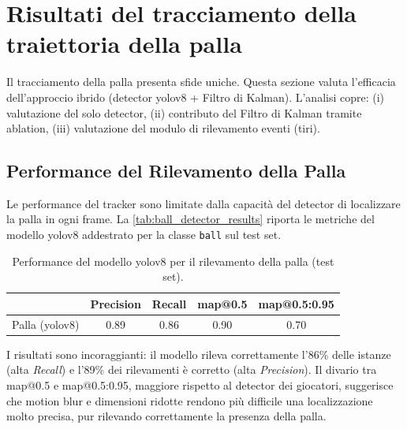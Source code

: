 \documentclass[12pt,a4paper,openright,twoside]{book}
\begin{document}
\section{Risultati del tracciamento della traiettoria della palla}
\label{sec:risultati-tracciamento-traiettoria}

Il tracciamento della palla presenta sfide uniche. 
Questa sezione valuta l'efficacia dell'approccio ibrido
(detector \ac{yolo}v8 + Filtro di Kalman). 
L'analisi copre: (i) valutazione del solo detector, 
(ii) contributo del Filtro di Kalman tramite ablation,
(iii) valutazione del modulo di rilevamento eventi (tiri).

\subsection{Performance del Rilevamento della Palla}
\label{sec:ball_detection_performance}

Le performance del tracker sono limitate dalla capacità 
del detector di localizzare la palla in ogni frame.
La \autoref{tab:ball_detector_results} riporta le 
metriche del modello \ac{yolo}v8 addestrato per la 
classe \texttt{ball} sul test set.

\begin{table}[t]
  \centering
  \caption{Performance del modello 
  \ac{yolo}v8 per il rilevamento della palla (test set).}
  \label{tab:ball_detector_results}
  \begin{tabular}{l S[table-format=1.2] S[table-format=1.2] 
    S[table-format=1.2] S[table-format=1.2]}
    \toprule
    & {\textbf{Precision}} & {\textbf{Recall}} 
    & {\textbf{\ac{map}@0.5}} & {\textbf{\ac{map}@0.5:0.95}} \\
    \midrule
    Palla (\ac{yolo}v8) & 0.89 & 0.86 & 0.90 & 0.70 \\
    \bottomrule
  \end{tabular}
\end{table}

I risultati sono incoraggianti: il modello rileva correttamente 
l'86\% delle istanze (alta \emph{Recall}) e l'89\% 
dei rilevamenti è corretto (alta \emph{Precision}).
Il divario tra \ac{map}@0.5 e \ac{map}@0.5:0.95, 
maggiore rispetto al detector dei giocatori, 
suggerisce che motion blur e dimensioni ridotte 
rendono più difficile una localizzazione molto precisa, 
pur rilevando correttamente la presenza della palla.
\end{document}
